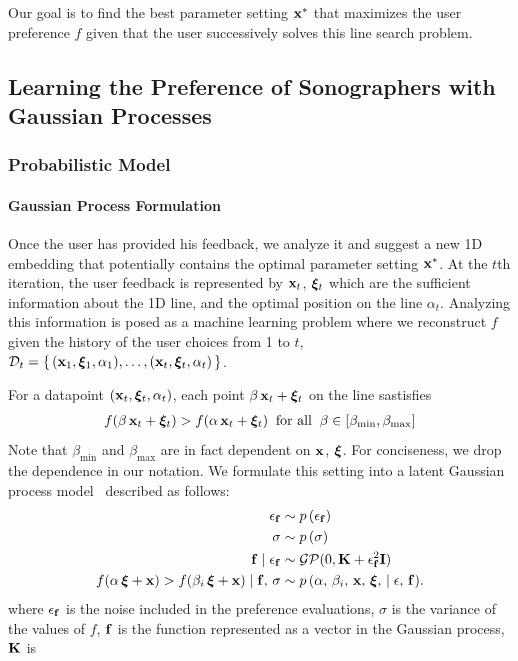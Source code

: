 Our goal is to find the best parameter setting \(\mathbf{x}^{*}\) that maximizes the user preference \(f\) given that the user successively solves this line search problem.

\subsection{Learning the Preference of Sonographers with Gaussian Processes}\label{section:gp}
\subsubsection{Probabilistic Model}
\paragraph{Gaussian Process Formulation}
Once the user has provided his feedback, we analyze it and suggest a new 1D embedding that potentially contains the optimal parameter setting \(\mathbf{x}^{*}\).
At the \(t\)th iteration, the user feedback is represented by \(\mathbf{x}_t\), \(\bm{\xi}_t\) which are the sufficient information about the 1D line, and the optimal position on the line \(\alpha_t\).
Analyzing this information is posed as a machine learning problem where we reconstruct \(f\) given the history of the user choices from 1 to \(t\), \(\mathcal{D}_t = \{\,(\mathbf{x}_1, \bm{\xi}_1, \alpha_1), \ldots, (\mathbf{x}_t, \bm{\xi}_t, \alpha_t)\,\}\).

For a datapoint \( (\mathbf{x}_t, \bm{\xi}_t, \alpha_t) \), each point \(\beta\,\mathbf{x}_t + \bm{\xi}_t\) on the line sastisfies
\begin{align}
f(\beta\,\mathbf{x}_t + \bm{\xi}_t ) > f(\alpha\,\mathbf{x}_t + \bm{\xi}_t) \;\;\text{for all}\;\; \beta \in [\beta_{\mathrm{min}}, \beta_{\mathrm{max}}]
\end{align}
Note that \(\beta_{\mathrm{min}}\) and \(\beta_{\mathrm{max}}\) are in fact dependent on \(\mathbf{x}\), \(\bm{\xi}\).
For conciseness, we drop the dependence in our notation.
We formulate this setting into a latent Gaussian process model~\cite{rasmussen_gaussian_2006} described as follows:
\begin{align}
\epsilon_{\mathbf{f}}           &\sim p\,(\epsilon_{\mathbf{f}}) \\
\sigma                  &\sim p\,(\sigma) \\
\mathbf{f} \mid \epsilon_{\mathbf{f}}  &\sim \mathcal{GP}(0, \mathbf{K} + \epsilon_{\mathbf{f}}^2\mathbf{I}) \\
  f(\alpha\,\bm{\xi} + \mathbf{x}) > f(\beta_i \,\bm{\xi} + \mathbf{x}) \mid \mathbf{f},\, \sigma
  &\sim p\,(\alpha,\, \beta_i,\, \mathbf{x},\,\bm{\xi},\, \mid \epsilon,\, \mathbf{f}). 
\end{align}
where \(\epsilon_{\mathbf{f}}\) is the noise included in the preference evaluations, \(\sigma\) is the variance of the values of \(f\), \(\mathbf{f}\) is the function represented as a vector in the Gaussian process, \(\mathcal{\mathbf{K}}\) is 

